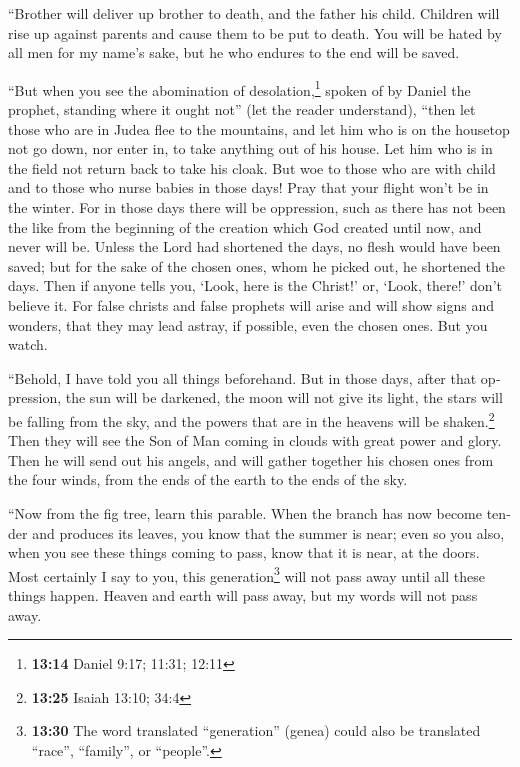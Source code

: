 \begin{paracol}{2}
\begin{otherlanguage}{english}
 ``Brother will deliver up brother to death, and the
father his child. Children will rise up against parents and cause them
to be put to death.  You will be hated by all men for my
name's sake, but he who endures to the end will be saved.

 ``But when you see the abomination of
desolation,\footnote{\textbf{13:14} Daniel 9:17; 11:31; 12:11} spoken of
by Daniel the prophet, standing where it ought not'' (let the reader
understand), ``then let those who are in Judea flee to the mountains,
 and let him who is on the housetop not go down, nor
enter in, to take anything out of his house.  Let him who
is in the field not return back to take his cloak.  But
woe to those who are with child and to those who nurse babies in those
days!  Pray that your flight won't be in the winter.
 For in those days there will be oppression, such as
there has not been the like from the beginning of the creation which God
created until now, and never will be.  Unless the Lord
had shortened the days, no flesh would have been saved; but for the sake
of the chosen ones, whom he picked out, he shortened the days.
 Then if anyone tells you, `Look, here is the Christ!'
or, `Look, there!' don't believe it.  For false christs
and false prophets will arise and will show signs and wonders, that they
may lead astray, if possible, even the chosen ones.  But
you watch.

``Behold, I have told you all things beforehand.  But in
those days, after that oppression, the sun will be darkened, the moon
will not give its light,  the stars will be falling from
the sky, and the powers that are in the heavens will be
shaken.\footnote{\textbf{13:25} Isaiah 13:10; 34:4}  Then
they will see the Son of Man coming in clouds with great power and
glory.  Then he will send out his angels, and will gather
together his chosen ones from the four winds, from the ends of the earth
to the ends of the sky.

 ``Now from the fig tree, learn this parable. When the
branch has now become tender and produces its leaves, you know that the
summer is near;  even so you also, when you see these
things coming to pass, know that it is near, at the doors.
 Most certainly I say to you, this generation\footnote{\textbf{13:30}
  The word translated ``generation'' (genea) could also be translated
  ``race'', ``family'', or ``people''.} will not pass away until all
these things happen.  Heaven and earth will pass away,
but my words will not pass away.


\end{otherlanguage}
\end{paracol}
